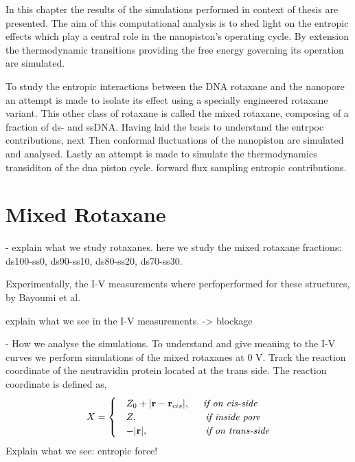 In this chapter the results of the simulations performed in context of thesis are
presented. The aim of this computational analysis is to shed light on the entropic
effects which play a central role in the nanopiston's operating cycle. By extension the
thermodynamic transitions providing the free energy governing its operation are
simulated.

To study the entropic interactions between the DNA rotaxane and the nanopore an attempt
is made to isolate its effect using a specially engineered rotaxane variant. This other
class of rotaxane is called the mixed rotaxane, composing of a fraction of ds- and
ssDNA. Having laid the basis to understand the entrpoc contributions, next Then conformal
fluctuations of the nanopiston are simulated and analysed. Lastly an attempt is made to
simulate the thermodynamics transiditon of the dna piston cycle. forward flux sampling
entropic contributions.

\section{Mixed Rotaxane}

- explain what we study rotaxanes.
  here we study the mixed rotaxane fractions: ds100-ss0, ds90-ss10, ds80-ss20, ds70-ss30.

  Experimentally, the I-V measurements where  perfoperformed for these structures, by
  Bayoumi et al.

  explain what we see in the I-V measurements. -> blockage

- How we analyse the simulations.
  To understand and give meaning to the I-V curves we perform simulations of the mixed
  rotaxanes at 0 V.
  Track the reaction coordinate of the neutravidin protein located at the trans side. The
  reaction coordinate is defined as,
\begin{equation}
  X = \begin{cases}
        &Z_0 + |\textbf{r} - \textbf{r}_{cis}|, \hspace{0.5cm} \textit{if on cis-side}\\
        &Z, \hspace{2.5cm} \textit{if inside pore}\\
        &-|\textbf{r}|, \hspace{2.11cm} \textit{if on trans-side}
      \end{cases}
\end{equation}
Explain what we see: entropic force!




